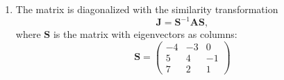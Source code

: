 {\begin{Solution}
\begin{enumerate}
    In summary, the eigenvalues and eigenvectors are
    \[
    \boxed{
      \lambda = \{-2, -1, 2 \}, \qquad
      \boldsymbol{\xi} = \left\{
        \begin{pmatrix}
          -4 \\
          5 \\
          7
        \end{pmatrix},
        \begin{pmatrix}
          -3 \\
          4 \\
          2
        \end{pmatrix},
        \begin{pmatrix}
          0 \\
          -1 \\
          1
        \end{pmatrix}
      \right\}
      }
    \]
  \item
    The matrix is diagonalized with the similarity transformation
    \[
    \mathbf{J} = \mathbf{S}^{-1} \mathbf{A} \mathbf{S},
    \]
    where $\mathbf{S}$ is the matrix with eigenvectors as columns:
    \[
    \mathbf{S} = 
    \begin{pmatrix}
      -4 & -3 & 0 \\
      5 & 4 & -1 \\
      7 & 2 & 1
    \end{pmatrix}
    \]



\end{enumerate}
\end{Solution}}

